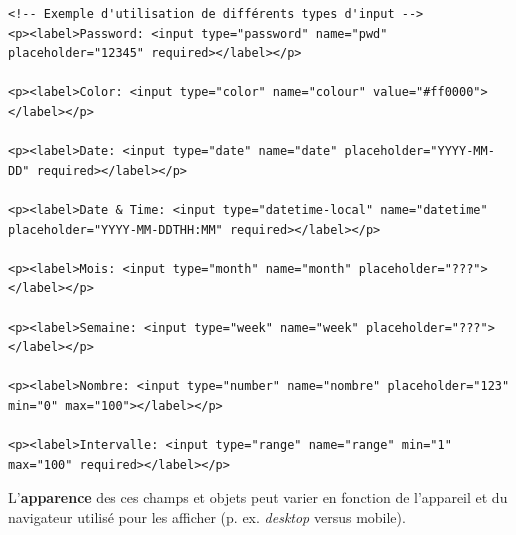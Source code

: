 \documentclass{report}
\begin{document}
\begin{lstlisting}[style=HTMLDraculaDark]
<!-- Exemple d'utilisation de différents types d'input -->
<p><label>Password: <input type="password" name="pwd" placeholder="12345" required></label></p>

<p><label>Color: <input type="color" name="colour" value="#ff0000"></label></p>

<p><label>Date: <input type="date" name="date" placeholder="YYYY-MM-DD" required></label></p>

<p><label>Date & Time: <input type="datetime-local" name="datetime" placeholder="YYYY-MM-DDTHH:MM" required></label></p>

<p><label>Mois: <input type="month" name="month" placeholder="???"></label></p>

<p><label>Semaine: <input type="week" name="week" placeholder="???"></label></p>

<p><label>Nombre: <input type="number" name="nombre" placeholder="123" min="0" max="100"></label></p>

<p><label>Intervalle: <input type="range" name="range" min="1" max="100" required></label></p>
\end{lstlisting}

\begin{note}{}{}
 L'\textbf{apparence} des ces champs et objets peut varier en fonction de l'appareil et du navigateur 
utilisé pour les afficher (p. ex. \textit{desktop} versus mobile).   
\end{note}
\end{document}
